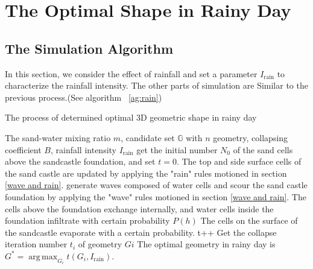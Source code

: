 \documentclass{mcmthesis}		    %
\DeclareMathOperator*{\argmax}{arg\,max}
\begin{document}
    \section{The Optimal Shape in Rainy Day} 	
    \subsection{The Simulation Algorithm} 	
    In this section, we consider the effect of rainfall and set a parameter $I_{\text{rain}}$ to characterize the rainfall intensity. The other parts of simulation are Similar to the previous process.(See algorithm~ \ref{ag:rain})
    \begin{algorithm}[htbp!]
	\caption{\small{The process of determined optimal 3D geometric shape in rainy day}}
    	\begin{algorithmic}[1]\small
    		\REQUIRE The sand-water mixing ratio $m$, candidate set $\mathbb{G}$ with $n$ geometry, collapsing coefficient $B$, rainfall intensity $I_{\text{rain}}$
            \STATE get the initial number $N_0$ of the sand cells above the sandcastle foundation, and set $t=0$.
            \STATE The top and side surface cells of the sand castle are updated by applying the "rain" rules motioned in section \ref{wave and rain}.
            \ENDFOR 
            \STATE generate waves composed of water cells and scour the sand castle foundation by applying the "wave" rules motioned in section \ref{wave and rain}.
            \STATE The cells above the foundation exchange internally, and water cells inside the foundation infiltrate with certain probability $P(h)$
            \STATE The cells on the surface of the sandcastle evaporate with a certain probability.
            \STATE t++
            \ENDWHILE
            \STATE Get the collapse iteration number $t_i$ of geometry $Gi$ 
            \ENDFOR
            \STATE The optimal geometry in rainy day is $G^{*} = \argmax_{G_i} t(G_i,I_{\text{rain}})$.
    	\end{algorithmic}\label{ag:rain}
\end{algorithm}
\end{document}
